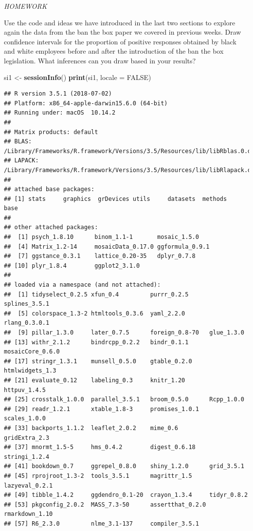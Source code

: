 \documentclass[]{book}
\newenvironment{Shaded}{\begin{snugshade}}{\end{snugshade}}
\newcommand{\DataTypeTok}[1]{\textcolor[rgb]{0.13,0.29,0.53}{#1}}
\newcommand{\KeywordTok}[1]{\textcolor[rgb]{0.13,0.29,0.53}{\textbf{#1}}}
\newcommand{\NormalTok}[1]{#1}
\newcommand{\OtherTok}[1]{\textcolor[rgb]{0.56,0.35,0.01}{#1}}
\newcommand{\StringTok}[1]{\textcolor[rgb]{0.31,0.60,0.02}{#1}}
\theoremstyle{definition}
\theoremstyle{definition}
\theoremstyle{definition}
\theoremstyle{remark}
\begin{document}
\emph{HOMEWORK}

Use the code and ideas we have introduced in the last two sections to
explore again the data from the ban the box paper we covered in previous
weeks. Draw confidence intervals for the proportion of positive
responses obtained by black and white employees before and after the
introduction of the ban the box legislation. What inferences can you
draw based in your results?

\begin{Shaded}
\begin{Highlighting}[]
\NormalTok{si1 <-}\StringTok{ }\KeywordTok{sessionInfo}\NormalTok{()}
\KeywordTok{print}\NormalTok{(si1, }\DataTypeTok{locale =} \OtherTok{FALSE}\NormalTok{)}
\end{Highlighting}
\end{Shaded}

\begin{verbatim}
## R version 3.5.1 (2018-07-02)
## Platform: x86_64-apple-darwin15.6.0 (64-bit)
## Running under: macOS  10.14.2
## 
## Matrix products: default
## BLAS: /Library/Frameworks/R.framework/Versions/3.5/Resources/lib/libRblas.0.dylib
## LAPACK: /Library/Frameworks/R.framework/Versions/3.5/Resources/lib/libRlapack.dylib
## 
## attached base packages:
## [1] stats     graphics  grDevices utils     datasets  methods   base     
## 
## other attached packages:
##  [1] psych_1.8.10      binom_1.1-1       mosaic_1.5.0     
##  [4] Matrix_1.2-14     mosaicData_0.17.0 ggformula_0.9.1  
##  [7] ggstance_0.3.1    lattice_0.20-35   dplyr_0.7.8      
## [10] plyr_1.8.4        ggplot2_3.1.0    
## 
## loaded via a namespace (and not attached):
##  [1] tidyselect_0.2.5 xfun_0.4         purrr_0.2.5      splines_3.5.1   
##  [5] colorspace_1.3-2 htmltools_0.3.6  yaml_2.2.0       rlang_0.3.0.1   
##  [9] pillar_1.3.0     later_0.7.5      foreign_0.8-70   glue_1.3.0      
## [13] withr_2.1.2      bindrcpp_0.2.2   bindr_0.1.1      mosaicCore_0.6.0
## [17] stringr_1.3.1    munsell_0.5.0    gtable_0.2.0     htmlwidgets_1.3 
## [21] evaluate_0.12    labeling_0.3     knitr_1.20       httpuv_1.4.5    
## [25] crosstalk_1.0.0  parallel_3.5.1   broom_0.5.0      Rcpp_1.0.0      
## [29] readr_1.2.1      xtable_1.8-3     promises_1.0.1   scales_1.0.0    
## [33] backports_1.1.2  leaflet_2.0.2    mime_0.6         gridExtra_2.3   
## [37] mnormt_1.5-5     hms_0.4.2        digest_0.6.18    stringi_1.2.4   
## [41] bookdown_0.7     ggrepel_0.8.0    shiny_1.2.0      grid_3.5.1      
## [45] rprojroot_1.3-2  tools_3.5.1      magrittr_1.5     lazyeval_0.2.1  
## [49] tibble_1.4.2     ggdendro_0.1-20  crayon_1.3.4     tidyr_0.8.2     
## [53] pkgconfig_2.0.2  MASS_7.3-50      assertthat_0.2.0 rmarkdown_1.10  
## [57] R6_2.3.0         nlme_3.1-137     compiler_3.5.1
\end{verbatim}
\end{document}
